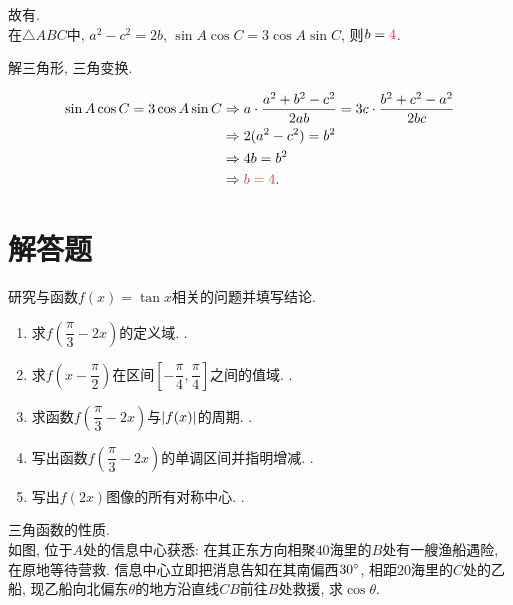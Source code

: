 \documentclass[8pt]{article}
\begin{document}
		故有.
		~\\

		在$\triangle ABC$中, $a^2 - c^2 = 2b$, $\sin A \cos C = 3 \cos A \sin C$, 则$b=\ansmath{4}$.
		
		解三角形, 三角变换.

		\begin{align*}
			\sin A \cos C = 3\cos A \sin C &\Rightarrow a \cdot \frac{a^2+b^2-c^2}{2ab}=3c\cdot\frac{b^2+c^2-a^2}{2bc}\\
			&\Rightarrow 2(a^2-c^2)=b^2\\
			&\Rightarrow 4b=b^2\\
			&\Rightarrow \ansmath{b=4}.
		\end{align*}

	\section{解答题}
		研究与函数$f(x)=\tan x$相关的问题并填写结论.
			
			\begin{enumerate}[label=(\arabic*)]
				\item 求$f\left(\dfrac{\pi}{3}-2x\right)$的定义域. .

				\item 求$f\left(x-\dfrac{\pi}{2}\right)$在区间$\left[-\dfrac{\pi}{4}, \dfrac{\pi}{4}\right]$之间的值域. \answord{$(-\infty, -1]\cup[1, +\infty)$}.

				\item 求函数$f\left(\dfrac{\pi}{3}-2x\right)$与$\left\lvert f(x) \right\rvert$的周期. .

				\item 写出函数$f\left(\dfrac{\pi}{3}-2x\right)$的单调区间并指明增减. .

				\item 写出$f(2x)$图像的所有对称中心. .
			\end{enumerate}

		三角函数的性质.
		~\\

		如图, 位于$A$处的信息中心获悉: 在其正东方向相聚$40$海里的$B$处有一艘渔船遇险, 在原地等待营救. 信息中心立即把消息告知在其南偏西$30^\circ$, 相距$20$海里的$C$处的乙船, 现乙船向北偏东$\theta$的地方沿直线$CB$前往$B$处救援, 求$\cos \theta$.
\end{document}
